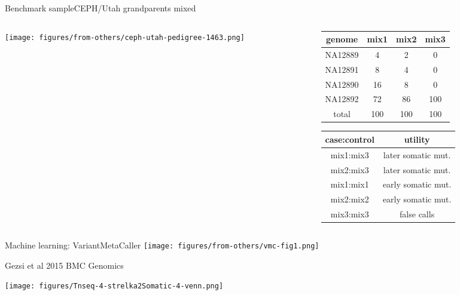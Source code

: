 \documentclass{beamer}
\begin{document}
\begin{frame}{Benchmark sample}{CEPH/Utah grandparents mixed}
\begin{center}
\begin{columns}[t]
\begin{column}{0.5\textwidth}

\texttt{[image: figures/from-others/ceph-utah-pedigree-1463.png]}
\end{column}

\begin{column}{0.5\textwidth}

\small
{
\begin{tabular}{cccc}
genome & mix1 & mix2 & mix3\\
\hline
NA12889 & 4 & 2 & 0\\
NA12891 & 8 & 4 & 0\\
NA12890 & 16 & 8 & 0\\
NA12892 & 72 & 86 & 100\\
\hline
total & 100 & 100 & 100\\
\end{tabular}
}
\vfill
{
\begin{tabular}{cc}
case:control & utility \\
\hline
\hline
mix1:mix3 & later somatic mut. \\
mix2:mix3 & later somatic mut. \\
\hline
mix1:mix1 & early somatic mut. \\
mix2:mix2 & early somatic mut. \\
\hline
mix3:mix3 & false calls \\
\end{tabular}
}
\end{column}
\end{columns}
\end{center}
\end{frame}

\begin{frame}{Machine learning: VariantMetaCaller}
\texttt{[image: figures/from-others/vmc-fig1.png]}

{\tiny Gezsi et al 2015 BMC Genomics}
\end{frame}

\begin{frame}


\texttt{[image: figures/Tnseq-4-strelka2Somatic-4-venn.png]}
\end{frame}
\end{document}
